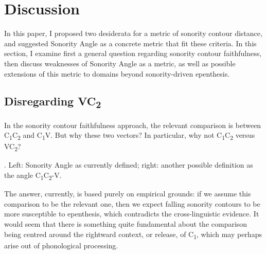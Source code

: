 \documentclass[12pt]{article}
\begin{document}
\section{Discussion} \label{issues}

In this paper, I proposed two desiderata for a metric of sonority contour distance, and suggested {\sc Sonority Angle} as a concrete metric that fit these criteria. In this section, I examine first a general question regarding sonority contour faithfulness, then discuss weaknesses of {\sc Sonority Angle} as a metric, as well as possible extensions of this metric to domains beyond sonority-driven epenthesis.

\subsection{Disregarding VC\textsubscript{2}} 

In the sonority contour faithfulness approach, the relevant comparison is between C\textsubscript{1}C\textsubscript{2} and C\textsubscript{1}V. But why these two vectors? In particular, why not C\textsubscript{1}C\textsubscript{2} versus VC\textsubscript{2}?

\ex. Left: {\sc Sonority Angle} as currently defined; right: another possible definition as the angle C\textsubscript{1}C\textsubscript{2}-V.

\begin{center}
\end{center}

The answer, currently, is based purely on empirical grounds: if we assume this comparison to be the relevant one, then we expect falling sonority contours to be more susceptible to epenthesis, which contradicts the cross-linguistic evidence. It would seem that there is something quite fundamental about the comparison being centred around the rightward context, or release, of C\textsubscript{1}, which may perhaps arise out of phonological processing.
\end{document}
